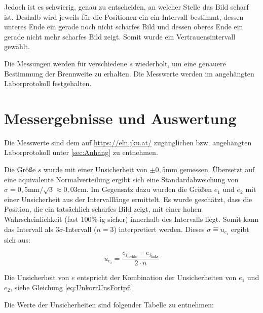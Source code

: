 \documentclass[a4paper,12pt]{article}
\begin{document}
Jedoch ist es schwierig, genau zu entscheiden, an welcher Stelle das Bild scharf ist. Deshalb wird jeweils für 
die Positionen ein ein Intervall bestimmt, dessen unteres Ende ein gerade noch nicht scharfes Bild und dessen oberes
Ende ein gerade nicht mehr scharfes Bild zeigt. Somit wurde ein Vertrauensintervall gewählt.

Die Messungen werden für verschiedene $s$ wiederholt, um eine genauere Bestimmung der Brennweite
zu erhalten. Die Messwerte werden im angehängten Laborprotokoll festgehalten.

\section{Messergebnisse und Auswertung}

Die Messwerte sind dem auf \url{https://eln.jku.at/} zugänglichen bzw. angehängten Laborprotokoll unter \ref{sec:Anhang} zu entnehmen.         %


Die Größe $s$ wurde mit einer Unsicherheit von $\pm 0,5\mathrm{mm}$ gemessen. Übersetzt auf eine äquivalente
Normalverteilung ergibt sich eine Standardabweichung von $\sigma = 0,5\mathrm{mm} / \sqrt{3} \approx 0,03\mathrm{cm}$.
Im Gegensatz dazu wurden die Größen $e_1$ und $e_2$ mit einer Unsicherheit aus der Intervalllänge
ermittelt. Es wurde geschätzt, dass die Position, die ein tatsächlich scharfes Bild zeigt, mit einer
hohen Wahrscheinlichkeit (fast 100\%-ig sicher) innerhalb des Intervalls liegt. Somit kann das 
Intervall als $3\sigma$-Intervall ($n=3$) interpretiert werden. Dieses $\sigma\widehat{=}u_{e_i}$ ergibt sich aus:

\begin{equation}
    \label{eq:BesselAbstandUnsicherheit}
    u_{e_i} = \frac{e_{i_\mathrm{rechts}} - e_{i_\mathrm{links}}}{2\cdot n}
\end{equation}

Die Unsicherheit von $e$ entspricht der Kombination der Unsicherheiten von $e_1$ und $e_2$, siehe Gleichung \ref{eq:UnkorrUnsFortpfl}

Die Werte der Unsicherheiten sind folgender Tabelle zu entnehmen:
\end{document}
